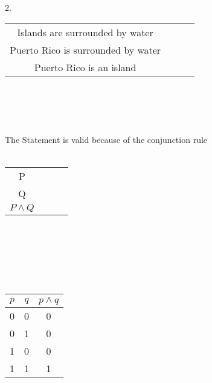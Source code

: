 \documentclass[11pt]{article}
\begin{document}
2. 
\begin{tabular}{cccc}
 Islands are surrounded by water \\
Puerto Rico is surrounded by water\\
\hline
Puerto Rico is an island\\
\end{tabular} \\\\\\\\
The Statement is valid because of the conjunction rule \\\\
\begin{tabular}{cccc}
P \\
Q \\
\hline
$ P \land Q$ \\
\end{tabular}\\\\\\\\\
\begin{tabular}{|c|c|c|}
\hline
$p$ & $q$ & $p \land q$ \\
\hline
0 & 0 & 0 \\
0 & 1 & 0 \\
1 & 0 & 0 \\
1 & 1 & 1 \\
\hline
\end{tabular}\\\\
\end{document}
